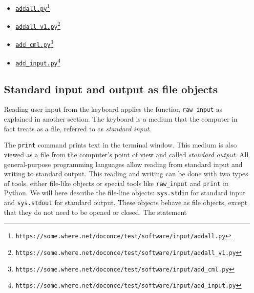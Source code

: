 \documentclass[graybox,sectrefs,envcountresetchap,open=right,final]{svmonodo}
\begin{document}
\begin{itemize}
 \item \href{{https://some.where.net/doconce/test/software/input/addall.py}}{\nolinkurl{addall.py}\footnote{\texttt{https://some.where.net/doconce/test/software/input/addall.py}}}

 \item \href{{https://some.where.net/doconce/test/software/input/addall_v1.py}}{\nolinkurl{addall_v1.py}\footnote{\texttt{https://some.where.net/doconce/test/software/input/addall\_v1.py}}}

 \item \href{{https://some.where.net/doconce/test/software/input/add_cml.py}}{\nolinkurl{add_cml.py}\footnote{\texttt{https://some.where.net/doconce/test/software/input/add\_cml.py}}}

 \item \href{{https://some.where.net/doconce/test/software/input/add_input.py}}{\nolinkurl{add_input.py}\footnote{\texttt{https://some.where.net/doconce/test/software/input/add\_input.py}}}
\end{itemize}

\noindent
\subsection{Standard input and output as file objects}

 


Reading user input from the keyboard applies the function
\Verb!raw_input! as explained in another section.
The keyboard is a medium that the computer in fact
treats as a file, referred to
as \emph{standard input}.

The \texttt{print} command prints text in the terminal window. This medium
is also viewed as a file from the computer's point of view and called
\emph{standard output}. All general-purpose programming languages
allow reading from standard input and
writing to standard output. This reading and writing can be done with
two types of tools, either file-like objects or special tools like
\Verb!raw_input!
and \texttt{print} in Python.
We will here describe the file-line objects:
\texttt{sys.stdin} for standard input
and \texttt{sys.stdout} for standard output. These objects
behave as file objects, except that they do not need to be opened or
closed. The statement
\end{document}
